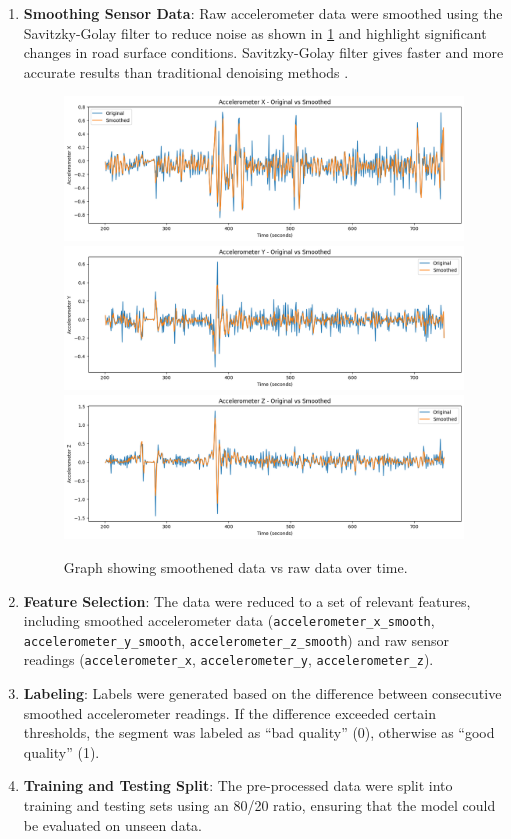 \documentclass[a4paper,12pt]{Classes/RoboticsLaTeX}
\begin{document}
\begin{abstracts}
\begin{enumerate}
    \item \textbf{Smoothing Sensor Data}: Raw accelerometer data were smoothed using the Savitzky-Golay filter to reduce noise as shown in \ref{fig:smooth} and highlight significant changes in road surface conditions. Savitzky-Golay filter gives faster and more accurate results than traditional denoising methods \cite{Karaim}.
    \begin{figure}[H]
\centering
\includegraphics[width=\linewidth]{Figures/acc_x.png}
\includegraphics[width=\linewidth]{Figures/acc_y.png}
\includegraphics[width=\linewidth]{Figures/acc_z.png}
\caption{Graph showing smoothened data vs raw data over time.}
\label{fig:smooth}
\end{figure}
    \item \textbf{Feature Selection}: The data were reduced to a set of relevant features, including smoothed accelerometer data (\texttt{accelerometer\_x\_smooth}, \texttt{accelerometer\_y\_smooth}, \texttt{accelerometer\_z\_smooth}) and raw sensor readings (\texttt{accelerometer\_x}, \texttt{accelerometer\_y}, \texttt{accelerometer\_z}).
    \item \textbf{Labeling}: Labels were generated based on the difference between consecutive smoothed accelerometer readings. If the difference exceeded certain thresholds, the segment was labeled as ``bad quality'' (0), otherwise as ``good quality'' (1).
    \item \textbf{Training and Testing Split}: The pre-processed data were split into training and testing sets using an 80/20 ratio, ensuring that the model could be evaluated on unseen data.
\end{enumerate}


\end{abstracts}
\end{document}
